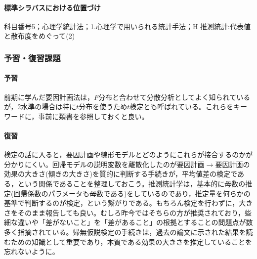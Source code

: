 \paragraph{標準シラバスにおける位置づけ}
科目番号5；心理学統計法；1.心理学で用いられる統計手法；H 推測統計:代表値と散布度をめぐって(2)
\subsubsection{予習・復習課題}
\paragraph{予習}
前期に学んだ要因計画法は，$F$分布と合わせて分散分析としてよく知られているが，2水準の場合は特に$t$分布を使うため$t$検定とも呼ばれている。これらをキーワードに，事前に類書を参照しておくと良い。
\paragraph{復習}
検定の話に入ると，要因計画や線形モデルとどのようにこれらが接合するのかが分かりにくい。回帰モデルの説明変数を離散化したのが要因計画$\to$要因計画の効果の大きさ(傾きの大きさ)を質的に判断する手続きが，平均値差の検定である，という関係であることを整理しておこう。推測統計学は，基本的に母数の推定(回帰係数のパラメータも母数である)をしているのであり，推定量を何らかの基準で判断するのが検定，という繋がりである。もちろん検定を行わずに，大きさをそのまま報告しても良い。むしろ昨今ではそちらの方が推奨されており，些細な違いや「差がないこと」を「差があること」の根拠とすることの問題点が数多く指摘されている。帰無仮説検定の手続きは，過去の論文に示された結果を読むための知識として重要であり，本質である効果の大きさを推定していることを忘れないように。